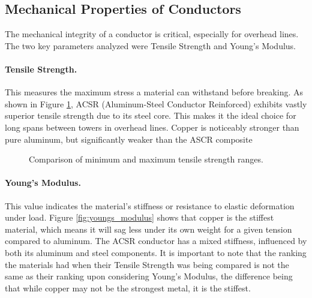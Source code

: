 \documentclass[12pt, a4paper]{article}
\begin{document}
\newpage

\subsection{Mechanical Properties of Conductors}
The mechanical integrity of a conductor is critical, especially for overhead lines. The two key parameters analyzed were Tensile Strength and Young's Modulus.

\paragraph{Tensile Strength.} This measures the maximum stress a material can withstand before breaking. As shown in Figure \ref{fig:tensile_strength}, ACSR (Aluminum-Steel Conductor Reinforced) exhibits vastly superior tensile strength due to its steel core. This makes it the ideal choice for long spans between towers in overhead lines. Copper is noticeably stronger than pure aluminum, but significantly weaker than the ASCR composite 

\begin{figure}[h!]
    \centering
    \caption{Comparison of minimum and maximum tensile strength ranges.}
    \label{fig:tensile_strength}
\end{figure}

\paragraph{Young's Modulus.} This value indicates the material's stiffness or resistance to elastic deformation under load. Figure \ref{fig:youngs_modulus} shows that copper is the stiffest material, which means it will sag less under its own weight for a given tension compared to aluminum. The ACSR conductor has a mixed stiffness, influenced by both its aluminum and steel components. It is important to note that the ranking the materials had when their Tensile Strength was being compared is not the same as their ranking upon considering Young's Modulus, the difference being that while copper may not be the strongest metal, it is the stiffest.
\end{document}
